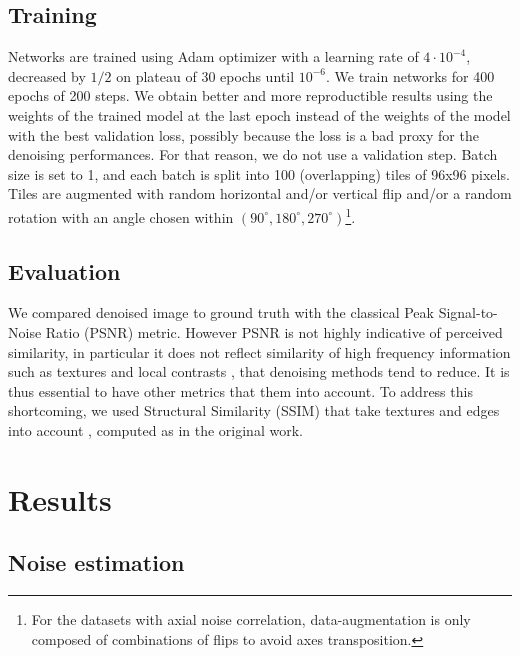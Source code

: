 \documentclass{article}
\begin{document}
\subsection{Training}
Networks are trained using Adam optimizer with a learning rate of $4\cdot10^{-4}$, decreased by $1/2$ on plateau of 30 epochs until $10^{-6}$. We train networks for 400 epochs of 200 steps.
We obtain better and more reproductible results using the weights of the trained model at the last epoch instead of the weights of the model with the best validation loss, possibly because the loss is a bad proxy for the denoising performances. For that reason, we do not use a validation step.
Batch size is set to 1, and each batch is split into 100 (overlapping) tiles of 96x96 pixels.
Tiles are augmented with random horizontal and/or vertical flip and/or a random rotation with an angle chosen within $(90^\circ, 180^\circ, 270^\circ)$\footnote{For the datasets with axial noise correlation, data-augmentation is only composed of combinations of flips to avoid axes transposition.}.

\subsection{Evaluation}
We compared denoised image to ground truth with the classical Peak Signal-to-Noise Ratio (PSNR) metric.
However PSNR is not highly indicative of perceived similarity, in particular it does not reflect similarity of high frequency information such as textures and local contrasts \cite{wang2004image}, that denoising methods tend to reduce. It is thus essential to have other metrics that them into account.
To address this shortcoming, we used Structural Similarity (SSIM) that take textures and edges into account \cite{wang2004image}, computed as in the original work.

\section{Results}
\label{sec:results}
\subsection{Noise estimation}
\end{document}
